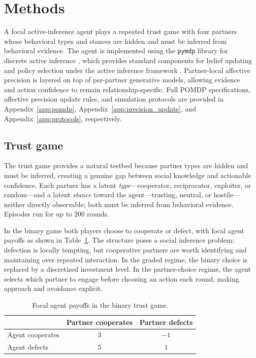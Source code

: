 \section{Methods}

A focal active-inference agent plays a repeated trust game with four partners whose behavioral types and stances are hidden and must be inferred from behavioral evidence. The agent is implemented using the \texttt{pymdp} library for discrete active inference \cite{Heins2022Pymdp,DaCosta2020DiscreteSynthesis}, which provides standard components for belief updating and policy selection under the active inference framework \cite{Friston2010FreeEnergy,Friston2017ProcessTheory,Parr2022ActiveInference}. Partner-local affective precision is layered on top of per-partner generative models, allowing evidence and action confidence to remain relationship-specific. Full POMDP specifications, affective precision update rules, and simulation protocols are provided in Appendix~\ref{app:pomdp}, Appendix~\ref{app:precision_update}, and Appendix~\ref{app:protocols}, respectively.

\subsection{Trust game}

The trust game \cite{Berg1995Trust,KingCasas2005Trust} provides a natural testbed because partner types are hidden and must be inferred, creating a genuine gap between social knowledge and actionable confidence. Each partner has a latent \emph{type}---cooperator, reciprocator, exploiter, or random---and a latent \emph{stance} toward the agent---trusting, neutral, or hostile---neither directly observable; both must be inferred from behavioral evidence. Episodes run for up to 200 rounds.

In the binary game both players choose to cooperate or defect, with focal agent payoffs as shown in Table~\ref{tab:payoff}. The structure poses a social inference problem: defection is locally tempting, but cooperative partners are worth identifying and maintaining over repeated interaction. In the graded regime, the binary choice is replaced by a discretized investment level. In the partner-choice regime, the agent selects which partner to engage before choosing an action each round, making approach and avoidance explicit.

\begin{table}[H]
\centering
\caption{Focal agent payoffs in the binary trust game.}
\label{tab:payoff}
\begin{tabular}{lcc}
\toprule
 & Partner cooperates & Partner defects \\
\midrule
Agent cooperates & $3$ & $-1$ \\
Agent defects & $5$ & $1$ \\
\bottomrule
\end{tabular}
\end{table}

